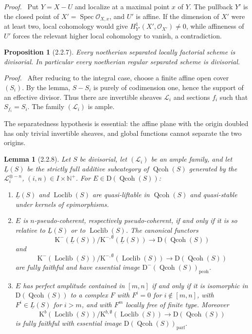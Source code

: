\documentclass[13pt]{extarticle}
\newcommand{\NN}{\mathbb N}
\newcommand{\cO}{\mathcal O}
\newcommand{\cL}{\mathcal L}
\newcommand{\D}{\mathrm D}
\newcommand{\K}{\mathrm K}
\newcommand{\Qcoh}{\operatorname{Qcoh}}
\newcommand{\Loclib}{\operatorname{Loclib}}
\newcommand{\Spec}{\operatorname{Spec}}
\newenvironment{prooftext}[1][Proof]{\par\noindent\emph{#1.}\ }{\par\medskip}
\newtheorem*{lemma*}{Lemma}
\newtheorem*{proposition*}{Proposition}
\begin{document}
\begin{prooftext}
Put $Y=X-U$ and localize at a maximal point $x$ of $Y$. The pullback $Y'$ is the closed point of $X'=\Spec\cO_{X,x}$, and $U'$ is affine. If the dimension of $X'$ were at least two, local cohomology would give $H^1_{Y'}(X',\cO_{X'})\ne0$, while affineness of $U'$ forces the relevant higher local cohomology to vanish, a contradiction.
\end{prooftext}

\begin{proposition*}[2.2.7]
Every noetherian separated locally factorial scheme is divisorial. In particular every noetherian regular separated scheme is divisorial.
\end{proposition*}

\begin{prooftext}
After reducing to the integral case, choose a finite affine open cover $(S_i)$. By the lemma, $S-S_i$ is purely of codimension one, hence the support of an effective divisor. Thus there are invertible sheaves $\cL_i$ and sections $f_i$ such that $S_{f_i}=S_i$. The family $(\cL_i)$ is ample.
\end{prooftext}

The separatedness hypothesis is essential: the affine plane with the origin doubled has only trivial invertible sheaves, and global functions cannot separate the two origins.

\begin{lemma*}[2.2.8]
Let $S$ be divisorial, let $(\cL_i)$ be an ample family, and let $\underline L(S)$ be the strictly full additive subcategory of $\Qcoh(S)$ generated by the $\cL_i^{\otimes -n}$, $(i,n)\in I\times\NN^+$. For $E\in\D(\Qcoh(S))$:
\begin{enumerate}[label=\alph*)]
\item $\underline L(S)$ and $\Loclib(S)$ are quasi-liftable in $\Qcoh(S)$ and quasi-stable under kernels of epimorphisms.
\item $E$ is $n$-pseudo-coherent, respectively pseudo-coherent, if and only if it is so relative to $\underline L(S)$ or to $\Loclib(S)$. The canonical functors
\[
\K^-(\underline L(S))/\K^{-,\emptyset}(\underline L(S))\to\D(\Qcoh(S))
\]
and
\[
\K^-(\Loclib(S))/\K^{-,\emptyset}(\Loclib(S))\to\D(\Qcoh(S))
\]
are fully faithful and have essential image $\D^-(\Qcoh(S))_{\mathrm{pcoh}}$.
\item $E$ has perfect amplitude contained in $[m,n]$ if and only if it is isomorphic in $\D(\Qcoh(S))$ to a complex $F$ with $F^i=0$ for $i\notin[m,n]$, with $F^i\in\underline L(S)$ for $i>m$, and with $F^m$ locally free of finite type. Moreover
\[
\K^b(\Loclib(S))/\K^{b,\emptyset}(\Loclib(S))\to\D(\Qcoh(S))
\]
is fully faithful with essential image $\D(\Qcoh(S))_{\mathrm{parf}}$.
\end{enumerate}
\end{lemma*}
\end{document}
